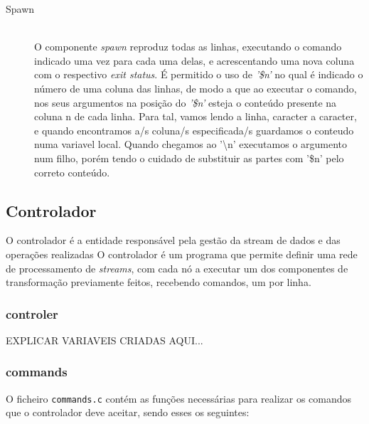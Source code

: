 \documentclass[12pt]{article}
\begin{document}
\begin{description}
\item[Spawn] \hfill \\
    O componente \textit{spawn} reproduz todas as linhas, executando o comando indicado uma vez para cada uma delas, e acrescentando uma nova coluna com o respectivo \textit{exit status}. É permitido o uso de \textit{'\$n'} no qual é indicado o número de uma coluna das linhas, de modo a que ao executar o comando, nos seus argumentos na posição do \textit{'\$n'} esteja o conteúdo presente na coluna n de cada linha. Para tal, vamos lendo a linha, caracter a caracter, e quando encontramos a/s coluna/s especificada/s guardamos o conteudo numa variavel local. Quando chegamos ao '\textbackslash n' executamos o argumento num filho, porém tendo o cuidado de substituir as partes com '\$n' pelo correto conteúdo.  

\end{description} 


\subsection{Controlador}
O controlador é a entidade responsável pela gestão da stream de dados e das operações realizadas
O controlador é um programa que permite definir uma rede de processamento de \textit{streams}, com cada nó a executar um dos componentes de transformação previamente feitos, recebendo comandos, um por linha. 

\subsubsection{controler}
EXPLICAR VARIAVEIS CRIADAS AQUI...

\subsubsection{commands}
O ficheiro \texttt{commands.c} contém as funções necessárias para realizar os comandos que o controlador deve aceitar, sendo esses os seguintes:
\end{document}
